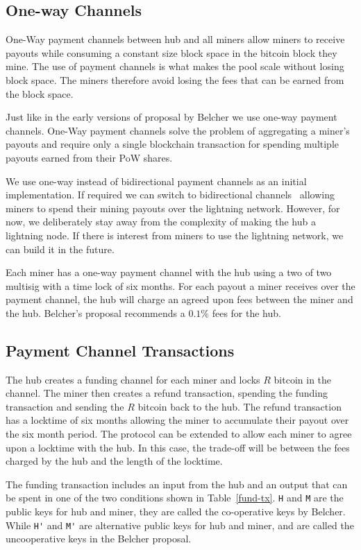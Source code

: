 \documentclass{article}
\begin{document}
\subsection{One-way Channels}

One-Way payment channels between hub and all miners allow miners to
receive payouts while consuming a constant size block space in the
bitcoin block they mine. The use of payment channels is what makes the
pool scale without losing block space. The miners therefore avoid
losing the fees that can be earned from the block space.

Just like in the early versions of proposal by Belcher we use one-way
payment channels. One-Way payment channels solve the problem of
aggregating a miner's payouts and require only a single blockchain
transaction for spending multiple payouts earned from their PoW
shares.

We use one-way instead of bidirectional payment channels as an initial
implementation. If required we can switch to bidirectional
channels~\cite{poon2016bitcoin} allowing miners to spend their mining
payouts over the lightning network. However, for now, we deliberately
stay away from the complexity of making the hub a lightning node. If
there is interest from miners to use the lightning network, we can
build it in the future.

Each miner has a one-way payment channel with the hub using a two of
two multisig with a time lock of six months. For each payout a miner
receives over the payment channel, the hub will charge an agreed upon
fees between the miner and the hub. Belcher's proposal recommends a
$0.1\%$ fees for the hub.

\subsection{Payment Channel Transactions}

The hub creates a funding channel for each miner and locks $R$ bitcoin
in the channel. The miner then creates a refund transaction, spending
the funding transaction and sending the $R$ bitcoin back to the
hub. The refund transaction has a locktime of six months allowing the
miner to accumulate their payout over the six month period. The
protocol can be extended to allow each miner to agree upon a locktime
with the hub. In this case, the trade-off will be between the fees
charged by the hub and the length of the locktime.

The funding transaction includes an input from the hub and an output
that can be spent in one of the two conditions shown in
Table~\ref{fund-tx}. \verb|H| and \verb|M| are the public keys for hub
and miner, they are called the co-operative keys by Belcher. While
\verb|H'| and \verb|M'| are alternative public keys for hub and miner,
and are called the uncooperative keys in the Belcher proposal.
\end{document}
